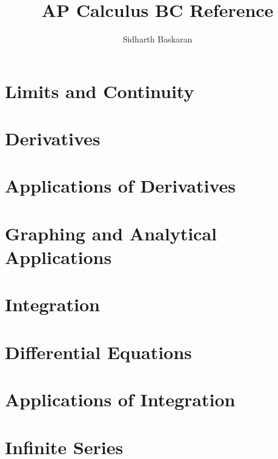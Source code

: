 \documentclass[11pt]{article}
\title{AP Calculus BC Reference}
\author{Sidharth Baskaran}
\begin{document}
\maketitle
\tableofcontents
\newpage

\section{Limits and Continuity}\label{sec:limits-and-continuity}


\section{Derivatives}\label{sec:derivatives}


\section{Applications of Derivatives}\label{sec:applications-of-derivatives}


\section{Graphing and Analytical Applications}\label{sec:graphing-and-analytical-applications}


\section{Integration}\label{sec:integration}


\section{Differential Equations}\label{sec:differential-equations}


\section{Applications of Integration}\label{sec:applications-of-integration}


\section{Infinite Series}\label{sec:infinite-series}

\end{document}
